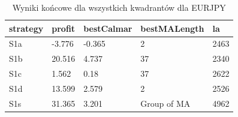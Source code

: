 \newpage
 \begin{table}[t!]
 \caption{Wyniki końcowe dla wszystkich kwadrantów dla EURJPY}
 \begin{center} 
 \begin{tabular}{|l|l|l|l|l|} 
 \hline \textbf{strategy} & \textbf{profit} & \textbf{bestCalmar} & \textbf{bestMALength} & \textbf{la} \\ \hline  
S1a & -3.776 & -0.365 & 2 & 2463\\ \hline 
S1b & 20.516 & 4.737 & 37 & 2340\\ \hline 
S1c & 1.562 & 0.18 & 37 & 2622\\ \hline 
S1d & 13.599 & 2.579 & 2 & 2526\\ \hline 
S1s & 31.365 & 3.201 & Group of MA & 4962\\ 
\hline \end{tabular} 
 \end{center} 
 \end{table}
\FloatBarrier
